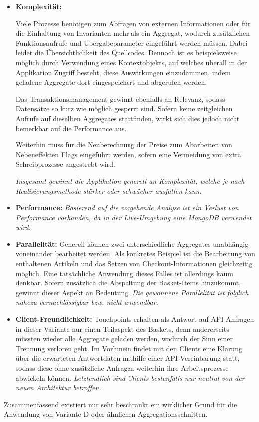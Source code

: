 \begin{itemize}[topsep=-2pt]
	\item \textbf{Komplexität: } {Viele Prozesse benötigen zum Abfragen von externen Informationen oder für die Einhaltung von Invarianten mehr als ein Aggregat, wodurch zusätzlichen Funktionsaufrufe und Übergabeparameter eingeführt werden müssen. Dabei leidet die Übersichtlichkeit des Quellcodes. Dennoch ist es beispielsweise möglich durch Verwendung eines Kontextobjekts, auf welches überall in der Applikation Zugriff besteht, diese Auswirkungen einzudämmen, indem geladene Aggregate dort eingespeichert und abgerufen werden.
		
	Das Transaktionsmanagement gewinnt ebenfalls an Relevanz, sodass Datensätze so kurz wie möglich gesperrt sind. Sofern keine zeitgleichen Aufrufe auf dieselben Aggregates stattfinden, wirkt sich dies jedoch nicht bemerkbar auf die Performance aus. 
	
	Weiterhin muss für die Neuberechnung der Preise zum Abarbeiten von Nebeneffekten Flags eingeführt werden, sofern eine Vermeidung von extra Schreibprozesse angestrebt wird. 
	
	\emph{Insgesamt gewinnt die Applikation generell an Komplexität, welche je nach Realisierungsmethode stärker oder schwächer ausfallen kann.}}

	\item \textbf{Performance: } { \emph{Basierend auf die vorgehende Analyse ist ein Verlust von Performance vorhanden, da in der Live-Umgebung eine MongoDB verwendet wird.} }
	
	\item \textbf{Parallelität: } { Generell können zwei unterschiedliche Aggregates unabhängig voneinander bearbeitet werden. Als konkretes Beispiel ist die Bearbeitung von enthaltenen Artikeln und das Setzen von Checkout-Informationen gleichzeitig möglich. Eine tatsächliche Anwendung dieses Falles ist allerdings kaum denkbar. Sofern zusätzlich die Abspaltung der Basket-Items hinzukommt, gewinnt dieser Aspekt an Bedeutung. \emph{Die gewonnene Parallelität ist folglich nahezu vernachlässigbar bzw. nicht anwendbar.}}
	\item \textbf{Client-Freundlichkeit: } { Touchpoints erhalten als Antwort auf API-Anfragen in dieser Variante nur einen Teilaspekt des Baskets, denn andererseits müssten wieder alle Aggregate geladen werden, wodurch der Sinn einer Trennung verloren geht. Im Vorhinein findet mit den Clients eine Klärung über die erwarteten Antwortdaten mithilfe einer API-Vereinbarung statt, sodass diese ohne zusätzliche Anfragen weiterhin ihre Arbeitsprozesse abwickeln können. \emph{Letztendlich sind Clients bestenfalls nur neutral von der neuen Architektur betroffen.}}
\end{itemize}

Zusammenfassend existiert nur sehr beschränkt ein wirklicher Grund für die Anwendung von Variante D oder ähnlichen Aggregationsschnitten.